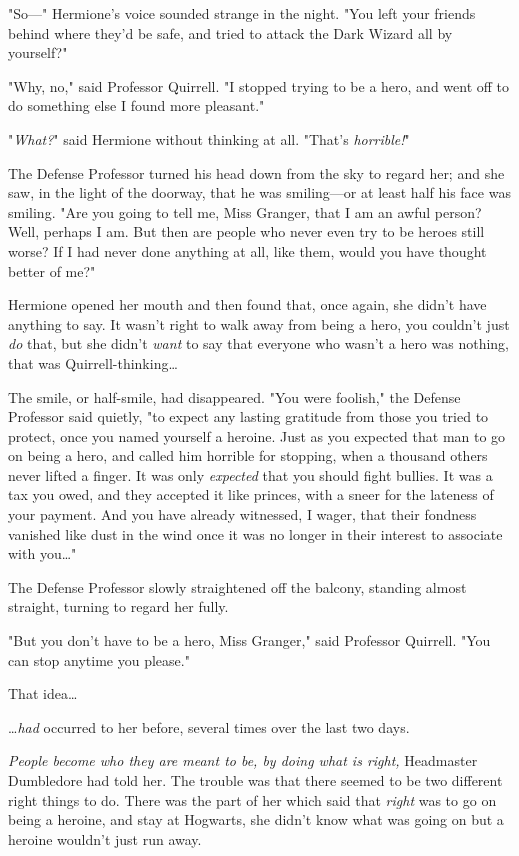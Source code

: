 "So---" Hermione's voice sounded strange in the night. "You left your friends 
behind where they'd be safe, and tried to attack the Dark Wizard all by 
yourself?"

"Why, no," said Professor Quirrell. "I stopped trying to be a hero, and went 
off to do something else I found more pleasant."

"\emph{What?}" said Hermione without thinking at all. "That's \emph{horrible!}"

The Defense Professor turned his head down from the sky to regard her; and she 
saw, in the light of the doorway, that he was smiling---or at least half his 
face was smiling. "Are you going to tell me, Miss Granger, that I am an awful 
person? Well, perhaps I am. But then are people who never even try to be heroes 
still worse? If I had never done anything at all, like them, would you have 
thought better of me?"

Hermione opened her mouth and then found that, once again, she didn't have 
anything to say. It wasn't right to walk away from being a hero, you couldn't 
just \emph{do} that, but she didn't \emph{want} to say that everyone who wasn't 
a hero was nothing, that was Quirrell-thinking{\ldots}

The smile, or half-smile, had disappeared. "You were foolish," the Defense 
Professor said quietly, "to expect any lasting gratitude from those you tried 
to protect, once you named yourself a heroine. Just as you expected that man to 
go on being a hero, and called him horrible for stopping, when a thousand 
others never lifted a finger. It was only \emph{expected} that you should fight 
bullies. It was a tax you owed, and they accepted it like princes, with a sneer 
for the lateness of your payment. And you have already witnessed, I wager, that 
their fondness vanished like dust in the wind once it was no longer in their 
interest to associate with you{\ldots}"

The Defense Professor slowly straightened off the balcony, standing almost 
straight, turning to regard her fully.

"But you don't have to be a hero, Miss Granger," said Professor Quirrell. "You 
can stop anytime you please."

That idea{\ldots}

{\ldots}\emph{had} occurred to her before, several times over the last two days.

\emph{People become who they are meant to be, by doing what is right,} 
Headmaster Dumbledore had told her. The trouble was that there seemed to be two 
different right things to do. There was the part of her which said that 
\emph{right} was to go on being a heroine, and stay at Hogwarts, she didn't 
know what was going on but a heroine wouldn't just run away.

